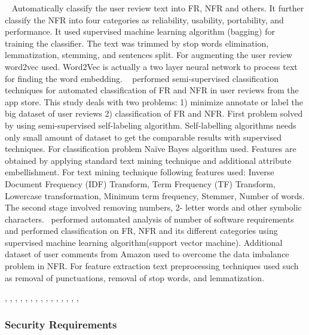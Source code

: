  \etal~\cite{} Automatically classify the user
review text into FR, NFR and others. It further classify the NFR into four
categories as reliability, usability, portability, and performance. It used
supervised machine learning algorithm (bagging) for training the classifier. The
text was trimmed by stop words elimination, lemmatization, stemming, and
sentences split. For augmenting the user review word2vec used.
Word2Vec is actually a two layer neural network to process text for finding the
word embedding.  \etal~\cite {Deocadez:2017}
performed semi-supervised classification techniques for automated classification
of FR and NFR in user reviews from the app store. This study deals with two
problems: 1) minimize annotate or label the big dataset of user reviews 2)
classification of FR and NFR. First problem solved by using semi-supervised
self-labeling algorithm. Self-labelling algorithms needs only small amount of
dataset to get the comparable results with supervised techniques. For
classification problem Naïve Bayes algorithm used. Features are obtained by
applying standard text mining technique and additional attribute embellishment.
For text mining technique following features used:  Inverse Document Frequency
(IDF)
Transform, Term Frequency (TF) Transform, Lowercase transformation, Minimum term
frequency, Stemmer, Number of words. The second stage involved removing numbers,
2- letter words and other symbolic
characters.\etal~\cite{Kurtanovic:2017} performed automated analysis of number
of software requirements and performed classification on FR, NFR and its different
categories using supervised machine learning algorithm(support vector machine).
Additional dataset of user comments from Amazon used to overcome the data
imbalance problem in NFR. For feature extraction text preprocessing techniques
used such as removal of punctuations, removal of stop words, and lemmatization.

\cite{Deocadez:2017}, \cite{Kurtanovic:2017}, \cite{Guzman:2017},
\cite{Abad:2017}, \cite{Dekhtyar:2017}, \cite{Rashwan:2012}, \cite{Lu:2017},
\cite{Hayes:2014}, \cite{Williams:2017}, \cite{Garzoli:2013},
\cite{Casamayor:2010}, \cite{Wang:2016}, \cite{Hussain:2012}, \cite{Jiang:2014},
\cite{Jha:2017}, \cite{Pinquie:2015}

\subsubsection{Security Requirements} 

